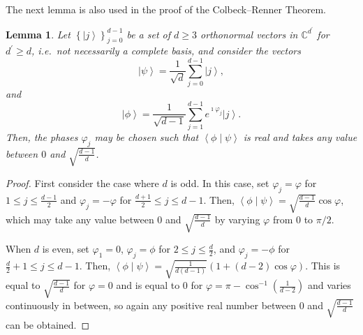 \documentclass[DIV=calc,fontsize=12pt]{scrartcl} %
\theoremstyle{definition}
\theoremstyle{plain}
\newtheorem{lemma}[definition]{Lemma}
\newcommand{\Ket}[1]{\ensuremath{\left \vert #1 \right \rangle}}
\newcommand{\BraKet}[2]{\ensuremath{\left \langle #1 \middle \vert #2
\right \rangle}}
\begin{document}
The next lemma is also used in the proof of the Colbeck--Renner
Theorem.
\begin{lemma}
\label{lem:Hardy:inner}
Let $\left \{ \Ket{j} \right \}_{j=0}^{d-1}$ be a set of $d \geq 3$
orthonormal vectors in $\mathbb{C}^{d^{\prime}}$ for $d^{\prime}
\geq d$, i.e.\ not necessarily a complete basis, and consider the
vectors
\begin{equation}
\Ket{\psi} = \frac{1}{\sqrt{d}} \sum_{j=0}^{d-1} \Ket{j},
\end{equation}
and
\begin{equation}
\Ket{\phi} = \frac{1}{\sqrt{d-1}} \sum_{j=1}^{d-1} e^{\imath
\varphi_j} \Ket{j}.
\end{equation}
Then, the phases $\varphi_j$ may be chosen such that
$\BraKet{\phi}{\psi}$ is real and takes any value between $0$ and
$\sqrt{\frac{d-1}{d}}$.
\end{lemma}
\begin{proof}
First consider the case where $d$ is odd.  In this case, set
$\varphi_j = \varphi$ for $1 \leq j \leq \frac{d-1}{2}$ and
$\varphi_j = -\varphi$ for $\frac{d+1}{2} \leq j \leq {d-1}$.  Then,
$\BraKet{\phi}{\psi} = \sqrt{\frac{d-1}{d}} \cos \varphi$, which may
take any value between $0$ and $\sqrt{\frac{d-1}{d}}$ by varying
$\varphi$ from $0$ to $\pi/2$.

When $d$ is even, set $\varphi_1 = 0$, $\varphi_j = \phi$ for $2
\leq j \leq \frac{d}{2}$, and $\varphi_j = -\phi$ for $\frac{d}{2} +
1 \leq j \leq {d-1}$. Then, $\BraKet{\phi}{\psi} =
\sqrt{\frac{1}{d(d-1)}} (1 + (d-2)\cos \varphi)$.  This is equal to
$\sqrt{\frac{d-1}{d}}$ for $\varphi = 0$ and is equal to $0$ for
$\varphi = \pi - \cos^{-1} \left ( \frac{1}{d-2} \right )$ and
varies continuously in between, so again any positive real number
between $0$ and $\sqrt{\frac{d-1}{d}}$ can be obtained.
\end{proof}
\end{document}
